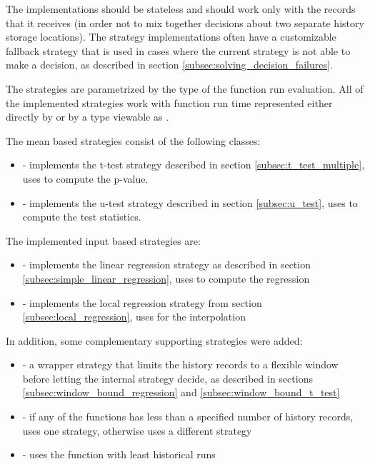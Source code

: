The implementations should be stateless and should work only with the  records that it receives (in order not to mix together decisions about two separate history storage locations). The strategy implementations often have a customizable fallback strategy that is used in cases where the current strategy is not able to make a decision, as described in section \ref{subsec:solving_decision_failures}.

The strategies are parametrized by the  type of the function run evaluation. All of the implemented strategies work with function run time represented either directly by  or by a type viewable as .

The mean based strategies consist of the following classes:
\begin{itemize}
	\item {} - implements the t-test strategy described in section \ref{subsec:t_test_multiple}, uses \cite{noauthor_apachemath_nodate} to compute the p-value.
	\item {} - implements the u-test strategy described in section \ref{subsec:u_test}, uses \cite{noauthor_apachemath_nodate} to compute the test statistics.
\end{itemize}

The implemented input based strategies are:
\begin{itemize}
	\item {} - implements the linear regression strategy as described in section \ref{subsec:simple_linear_regression}, uses \cite{noauthor_apachemath_nodate} to compute the regression

	\item {} - implements the local regression strategy from section \ref{subsec:local_regression}, uses \cite{noauthor_apachemath_nodate} for the interpolation
\end{itemize}

In addition, some complementary supporting strategies were added:
\begin{itemize}
	\item {} - a wrapper strategy that limits the history records to a flexible window before letting the internal strategy decide, as described in sections \ref{subsec:window_bound_regression} and \ref{subsec:window_bound_t_test}
\item {} - if any of the functions has less than a specified number of history records, uses one strategy, otherwise uses a different strategy
\item {} - uses the function with least historical runs
\end{itemize}

